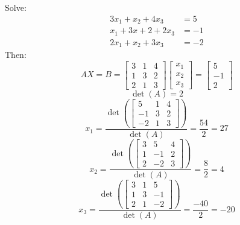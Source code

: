 \documentclass[12pt]{article}
\begin{document}
\begin{example} Solve: $$\begin{array}{rcl} 3x_1 + x_2 + 4x_3 &= 5 \\ x_1 + 3x+2 + 2x_3 &= -1 \\ 2x_1 + x_2 + 3x_3 &= -2 \end{array}$$ Then: $$AX = B = \begin{bmatrix} 3 & 1 & 4 \\ 1 & 3 & 2 \\ 2 & 1 & 3 \end{bmatrix} \begin{bmatrix} x_1 \\ x_2 \\ x_3 \end{bmatrix} = \begin{bmatrix} 5 \\ -1 \\ 2 \end{bmatrix} $$ $$\det(A) = 2 $$ $$x_1 = \frac{\det(\begin{bmatrix} 5 & 1 & 4 \\ -1 & 3 & 2 \\ -2 & 1 & 3 \end{bmatrix})}{\det(A)} = \frac{54}{2} = 27 $$ $$x_2 = \frac{\det(\begin{bmatrix} 3 & 5 & 4 \\ 1 & -1 & 2 \\ 2 & -2 & 3 \end{bmatrix})}{\det(A)} = \frac{8}{2} = 4 $$ $$x_3 = \frac{\det(\begin{bmatrix} 3 & 1 & 5 \\ 1 & 3 & -1 \\ 2 & 1 & -2 \end{bmatrix})}{\det(A)} = \frac{-40}{2} = -20 $$ \end{example} 
\end{document}
